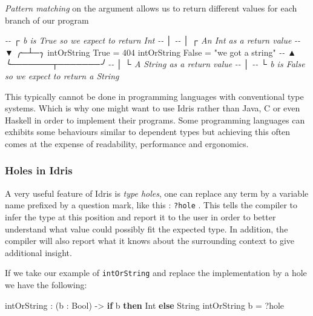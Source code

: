 \documentclass[
]{article}
\newenvironment{Shaded}{}{}
\newcommand{\CommentTok}[1]{\textcolor[rgb]{0.38,0.63,0.69}{\textit{#1}}}
\newcommand{\DataTypeTok}[1]{\textcolor[rgb]{0.56,0.13,0.00}{#1}}
\newcommand{\DecValTok}[1]{\textcolor[rgb]{0.25,0.63,0.44}{#1}}
\newcommand{\KeywordTok}[1]{\textcolor[rgb]{0.00,0.44,0.13}{\textbf{#1}}}
\newcommand{\NormalTok}[1]{#1}
\newcommand{\OperatorTok}[1]{\textcolor[rgb]{0.40,0.40,0.40}{#1}}
\newcommand{\OtherTok}[1]{\textcolor[rgb]{0.00,0.44,0.13}{#1}}
\newcommand{\StringTok}[1]{\textcolor[rgb]{0.25,0.44,0.63}{#1}}
\begin{document}
\emph{Pattern matching} on the argument allows us to return different
values for each branch of our program

\begin{Shaded}
\begin{Highlighting}[]
\CommentTok{{-}{-}           ┌ \textasciigrave{}b\textasciigrave{} is True so we expect to return \textasciigrave{}Int\textasciigrave{}}
\CommentTok{{-}{-}           │}
\CommentTok{{-}{-}           │      ┌ An Int as a return value}
\CommentTok{{-}{-}           ▼    ╭─┴─╮}
\NormalTok{intOrString }\DataTypeTok{True} \OtherTok{=} \DecValTok{404} 
\NormalTok{intOrString }\DataTypeTok{False} \OtherTok{=} \StringTok{"we got a string"}
\CommentTok{{-}{-}           ▲      ╰───────┬───────╯}
\CommentTok{{-}{-}           │              └ A String as a return value}
\CommentTok{{-}{-}           │}
\CommentTok{{-}{-}           └ \textasciigrave{}b\textasciigrave{} is \textasciigrave{}False\textasciigrave{} so we expect to return a String}
\end{Highlighting}
\end{Shaded}

This typically cannot be done in programming languages with conventional
type systems. Which is why one might want to use Idris rather than Java,
C or even Haskell in order to implement their programs. Some programming
languages can exhibits some behaviours similar to dependent types but
achieving this often comes at the expense of readability, performance
and ergonomics\cite{hasochism}.

\hypertarget{holes-in-idris}{%
\subsubsection{Holes in Idris}\label{holes-in-idris}}

A very useful feature of Idris is \emph{type holes}, one can replace any
term by a variable name prefixed by a question mark, like this :
\texttt{?hole} . This tells the compiler to infer the type at this
position and report it to the user in order to better understand what
value could possibly fit the expected type. In addition, the compiler
will also report what it knows about the surrounding context to give
additional insight.

If we take our example of \texttt{intOrString} and replace the
implementation by a hole we have the following:

\begin{Shaded}
\begin{Highlighting}[]
\NormalTok{intOrString }\OperatorTok{:}\NormalTok{ (b }\OperatorTok{:} \DataTypeTok{Bool}\NormalTok{) }\OtherTok{{-}\textgreater{}} \KeywordTok{if}\NormalTok{ b }\KeywordTok{then} \DataTypeTok{Int} \KeywordTok{else} \DataTypeTok{String}
\NormalTok{intOrString b }\OtherTok{=} \OperatorTok{?}\NormalTok{hole}
\end{Highlighting}
\end{Shaded}
\end{document}

